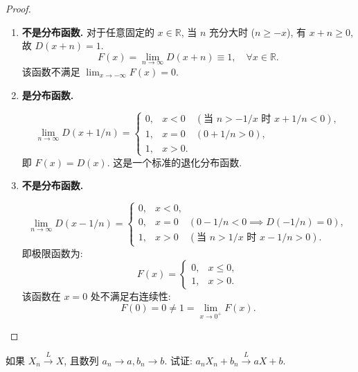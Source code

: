 \documentclass[../main.tex]{subfiles}
\begin{document}
\begin{proof}
  
\begin{enumerate}
\item \textbf{不是分布函数.}
对于任意固定的 \(x \in \mathbb{R}\), 当 \(n\) 充分大时 (\(n \ge -x\)), 有 \(x+n \ge 0\), 故 \(D(x+n)=1\).
\[
F(x) = \lim_{n \to \infty} D(x+n) \equiv 1, \quad \forall x \in \mathbb{R}.
\]
该函数不满足 \(\lim_{x \to -\infty} F(x) = 0\).

\item \textbf{是分布函数.}

\[
\lim_{n \to \infty} D(x+1/n) = 
\begin{cases} 
0, & x < 0 \quad (\text{当 } n > -1/x \text{ 时 } x+1/n < 0), \\
1, & x = 0 \quad (0+1/n > 0), \\
1, & x > 0.
\end{cases}
\]
即 \(F(x) = D(x)\). 这是一个标准的退化分布函数.

\item \textbf{不是分布函数.}

\[
\lim_{n \to \infty} D(x-1/n) = 
\begin{cases} 
0, & x < 0, \\
0, & x = 0 \quad (0-1/n < 0 \implies D(-1/n)=0), \\
1, & x > 0 \quad (\text{当 } n > 1/x \text{ 时 } x-1/n > 0).
\end{cases}
\]
即极限函数为:
\[
F(x) = \begin{cases} 0, & x \le 0, \\ 1, & x > 0. \end{cases}
\]
该函数在 \(x=0\) 处不满足右连续性:
\[
F(0) = 0 \neq 1 = \lim_{x \to 0^+} F(x).
\]
\end{enumerate}
\end{proof}
\begin{exercise}{}{}
如果 $X_n \xrightarrow{L} X$, 且数列 $a_n \to a, b_n \to b$. 试证: $a_n X_n + b_n \xrightarrow{L} aX + b$.
\end{exercise}
\end{document}
